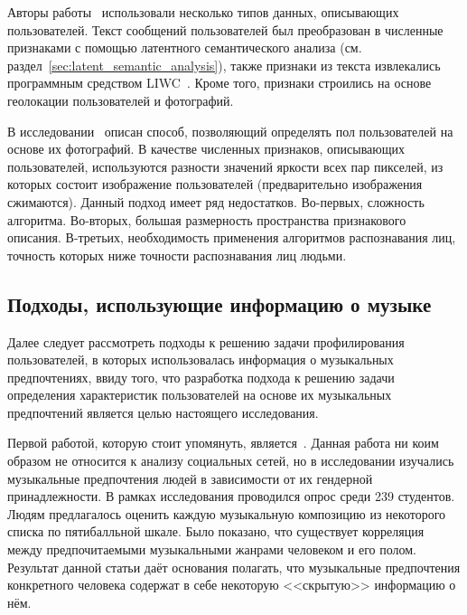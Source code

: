Авторы работы~\cite{farseev2015harvesting} использовали несколько
типов данных, описывающих пользователей. Текст сообщений пользователей
был преобразован в численные признаками с помощью латентного
семантического анализа (см. раздел~\ref{sec:latent_semantic_analysis}),
также признаки из текста извлекались программным средством
LIWC~\cite{pennebaker2001linguistic}. Кроме того, признаки
строились на основе геолокации пользователей и фотографий.

В исследовании~\cite{baluja2007boosting} описан способ, позволяющий
определять пол пользователей на основе их фотографий. В качестве 
численных признаков, описывающих пользователей, используются
разности значений яркости всех пар пикселей, из которых состоит
изображение пользователей (предварительно изображения сжимаются).
Данный подход имеет ряд недостатков. Во-первых, сложность
алгоритма. Во-вторых, большая размерность пространства признакового
описания. В-третьих, необходимость применения алгоритмов
распознавания лиц, точность которых ниже точности распознавания
лиц людьми.

\subsection{Подходы, использующие информацию о музыке}
\label{ssec:with_music}

Далее следует рассмотреть подходы к решению задачи профилирования
пользователей, в которых использовалась информация о музыкальных
предпочтениях, ввиду того, что разработка подхода к решению
задачи определения характеристик пользователей на основе их
музыкальных предпочтений является целью настоящего исследования.

Первой работой, которую стоит упомянуть, 
является~\cite{christenson1988genre}.
Данная работа ни коим образом не относится к анализу социальных сетей, но
в исследовании изучались музыкальные предпочтения людей в
зависимости от их гендерной принадлежности. В рамках исследования
проводился опрос среди 239 студентов. Людям предлагалось оценить каждую
музыкальную композицию из некоторого списка по пятибалльной шкале.
Было показано, что существует корреляция между предпочитаемыми
музыкальными жанрами человеком и его полом. Результат данной статьи
даёт основания полагать, что музыкальные предпочтения конкретного
человека содержат в себе некоторую <<скрытую>> информацию о нём.

